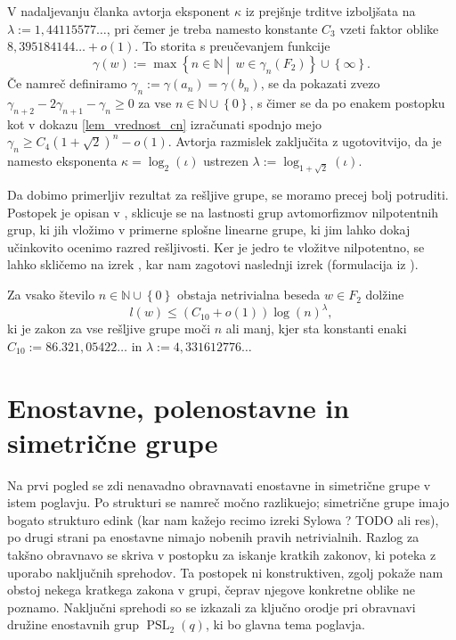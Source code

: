 \documentclass[mat1, tisk]{fmfdelo}
\numberwithin{equation}{section}  %
\begin{document}
V nadaljevanju članka \cite{Elkasapy_Thom_2013} avtorja eksponent $\kappa$ iz prejšnje trditve izboljšata na $\lambda := 1{,}44115577 \ldots$, pri čemer je treba namesto konstante $C_3$ vzeti faktor oblike $8{,}395184144 \ldots + o(1)$. To storita s preučevanjem funkcije \begin{equation*}
\gamma(w) := \max \left\{ n \in  \mathbb{N}  \middle|\, w \in \gamma_{n}(F_2) \right\} \cup \left\{ \infty\right\}. 
\end{equation*}  
Če namreč definiramo $\gamma_n := \gamma(a_{n}) = \gamma(b_{n})$, se da pokazati zvezo $\gamma_{n + 2} - 2 \gamma_{n+1}  - \gamma_{n} \ge  0$ za vse $n \in  \mathbb{N} \cup \left\{ 0\right\}$, s čimer se da po enakem postopku kot v dokazu \ref*{lem_vrednost_cn} izračunati spodnjo mejo $\gamma_n \ge C_4 (1 + \sqrt{2})^{n} - o(1)$.
Avtorja razmislek zaključita z ugotovitvijo, da je namesto eksponenta $\kappa = \log_2( \iota)$ ustrezen $\lambda := \log_{1 + \sqrt{2}}(\iota)$.

Da dobimo primerljiv rezultat za rešljive grupe, se moramo precej bolj potruditi. Postopek je opisan v \cite[str.~3--4]{Thom_2015}, sklicuje se na lastnosti grup avtomorfizmov nilpotentnih grup, ki jih vložimo
v primerne splošne linearne grupe, ki jim lahko dokaj učinkovito ocenimo razred rešljivosti. Ker je jedro te vložitve nilpotentno, se lahko skličemo na izrek \cite{trd_koncna_ugotovitev_nilpotentne_v_nalogi}, kar nam zagotovi naslednji izrek (formulacija iz \cite[str.~25]{Schneider_2016}).  

\begin{izrek}
\label{izr_glavni_izrek_resljive}
 Za vsako število $n \in  \mathbb{N} \cup  \left\{ 0\right\}$ obstaja netrivialna beseda $w \in F_2$ dolžine \begin{equation*}
 l(w) \le (C_{10} + o(1)) \log(n)^{\lambda},
 \end{equation*}  
   ki je zakon za vse rešljive grupe moči $n$ ali manj, kjer sta konstanti enaki $C_{10} := 86.321{,}05422 \ldots$ in $\lambda := 4{,}331612776 \ldots$ 
\end{izrek}


\section{Enostavne, polenostavne in simetrične grupe}

Na prvi pogled se zdi nenavadno obravnavati enostavne in simetrične grupe v istem poglavju. Po strukturi se namreč močno razlikuejo; simetrične grupe imajo bogato strukturo edink (kar nam kažejo recimo izreki Sylowa ? TODO ali res), po drugi strani pa enostavne
nimajo nobenih pravih netrivialnih. Razlog za takšno obravnavo se skriva v postopku za iskanje kratkih zakonov, ki poteka z uporabo naključnih sprehodov. Ta postopek ni konstruktiven, zgolj pokaže nam obstoj nekega kratkega zakona v grupi, čeprav njegove konkretne oblike ne poznamo.
Naključni sprehodi so se izkazali za ključno orodje pri obravnavi družine enostavnih grup $\operatorname{PSL}_2(q)$, ki bo glavna tema poglavja.
\end{document}
